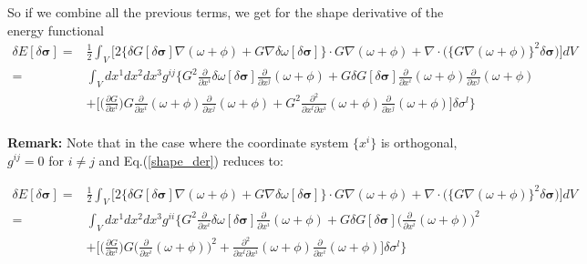 \documentclass[aps,prc,floatfix,showkeys,nofootinbib]{revtex4-1}
\newcommand{\beq}{\begin{equation}}
\newcommand{\eeq}{\end{equation}}
\newcommand{\Div}{\nabla\cdot}
\newcommand{\grad}{\nabla}
\begin{document}
\noindent So if we combine all the previous terms, we get for the shape derivative of the energy functional\\

\beq
\begin{split}
\delta E [\delta \bm{\sigma}] =& \frac{1}{2}\int_V \Bigg[ 2 \Big\{\delta G [ \delta \bm{\sigma}]\nabla(\omega + \phi) + G\nabla\delta \omega [\delta \bm{\sigma}]\Big\}\cdot G \nabla(\omega + \phi) + \Div \Big(\{G\grad (\omega + \phi)\}^2 \delta \bm{\sigma}\Big)\Bigg] dV\\
=& \int_Vdx^{1}dx^{2}dx^{3} g^{ij}\Bigg\{ G^2 \frac{\partial }{\partial x^{i}}\delta \omega[\delta \bm{\sigma}]\frac{\partial}{\partial x^{j}}(\omega + \phi) + G \delta G[\delta \bm{\sigma}]\frac{\partial}{\partial x^{i}}(\omega + \phi)\frac{\partial}{\partial x^{j}}(\omega + \phi) \\ 
&+ \Bigg[ \Big( \frac{\partial G}{\partial x^{l}}\Big)G\frac{\partial}{\partial x^{i}}(\omega + \phi)\frac{\partial}{\partial x^{j}}(\omega + \phi) + G^{2}\frac{\partial^2}{\partial x^{l}\partial x^{i}}(\omega + \phi) \frac{\partial}{\partial x^{j}}(\omega + \phi)\Bigg]\delta \sigma^{l} \Bigg\}
\end{split}\label{shape_der}
\eeq\\

\noindent \textbf{Remark:} Note that in the case where the coordinate system $\{ x^{i}\}$ is orthogonal, $g^{ij} = 0$ for $i\neq j$ and Eq.(\ref{shape_der}) reduces to:\\

\newpage


\beq
\begin{split}
\delta E [\delta \bm{\sigma}] =& \frac{1}{2}\int_V \Bigg[ 2 \Big\{\delta G [ \delta \bm{\sigma}]\nabla(\omega + \phi) + G\nabla\delta \omega [\delta \bm{\sigma}]\Big\}\cdot G \nabla(\omega + \phi) + \Div \Big(\{G\grad (\omega + \phi)\}^2 \delta \bm{\sigma}\Big)\Bigg] dV\\
=& \int_Vdx^{1}dx^{2}dx^{3} g^{ii}\Bigg\{ G^2 \frac{\partial }{\partial x^{i}}\delta \omega[\delta \bm{\sigma}]\frac{\partial}{\partial x^{i}}(\omega + \phi) + G \delta G[\delta \bm{\sigma}] \Big( \frac{\partial}{\partial x^{i}}(\omega + \phi)\Big)^2 \\ 
&+ \Bigg[ \Big( \frac{\partial G}{\partial x^{l}}\Big)G\Big(\frac{\partial}{\partial x^{i}}(\omega + \phi)\Big)^2 + \frac{\partial^2}{\partial x^{l}\partial x^{i}}(\omega + \phi) \frac{\partial}{\partial x^{i}}(\omega + \phi)\Bigg]\delta \sigma^{l} \Bigg\}
\end{split}
\eeq\\
\end{document}
